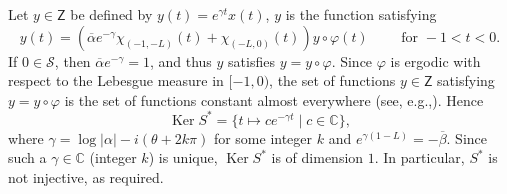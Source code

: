 \documentclass[JEP,XML,SOM,Unicode]{cedram}
\renewcommand{\eg}{e.g.,\xspace}
\theoremstyle{plain}
\theoremstyle{definition}
\DeclareMathOperator{\Ker}{Ker}
\newcommand{\abs}[1]{\left\lvert #1\right \rvert}
\begin{document}
Let $y \in \mathsf Z$ be defined by $y(t) = e^{\gamma t} x(t)$, \ie $y$ is the function satisfying
\begin{equation}
\label{FixedPointV}
y(t) = \left(\overline\alpha e^{-\gamma} \chi_{(-1, -L)}(t) + \chi_{(-L, 0)}(t)\right) y \circ \varphi(t) \qquad \text{ for } -1 < t < 0.
\end{equation}
If $0 \in \mathcal S$, then $\overline\alpha e^{-\gamma} = 1$, and thus $y$ satisfies $y = y \circ \varphi$. Since $\varphi$ is ergodic with respect to the Lebesgue measure in $[-1, 0)$, the set of functions $y \in \mathsf Z$ satisfying $y = y \circ \varphi$ is the set of functions constant almost everywhere (see, \eg \cite[Chap.\,II, Prop.\,2.1]{Mane1987Ergodic}). Hence
\begin{equation}
\label{EqKerS}
\Ker S^\ast = \{t \mapsto c e^{-\gamma t} \mid c \in \mathbb C\},
\end{equation}
where $\gamma = \log\abs{\alpha} - i (\theta + 2 k \pi)$ for some integer $k$ and $e^{\gamma(1 - L)} = - \overline\beta$. Since such a $\gamma \in \mathbb C$ (\ie integer $k$) is unique, $\Ker S^\ast$ is of dimension $1$. In particular, $S^\ast$ is not injective, as required.
\end{document}
